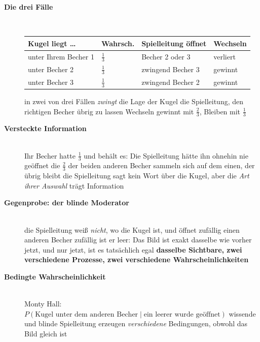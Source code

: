 \begin{description}
\item[{\rot\bf Die drei Fälle}]~\\[-\lblskip]
\begin{center}
\begin{tabular}{@{}llll@{}}
\toprule
\textbf{Kugel liegt \dots} & \textbf{Wahrsch.} & \textbf{Spielleitung öffnet} & \textbf{Wechseln} \\
\midrule
unter Ihrem Becher 1 & $\tfrac13$ & Becher 2 oder 3 & verliert \\
unter Becher 2 & $\tfrac13$ & zwingend Becher 3 & gewinnt \\
unter Becher 3 & $\tfrac13$ & zwingend Becher 2 & gewinnt \\
\bottomrule
\end{tabular}
\end{center}
\bi
  \ite in zwei von drei Fällen \emph{zwingt} die Lage der Kugel die
    Spielleitung, den richtigen Becher übrig zu lassen
  \ite Wechseln gewinnt mit $\tfrac23$, Bleiben mit $\tfrac13$
\ei
\os{\newpage}

\item[{\rot\bf Versteckte Information}]~\\[-\lblskip]
\bi
  \ite Ihr Becher hatte $\tfrac13$ und behält es: Die Spielleitung
    hätte ihn ohnehin nie geöffnet
  \ite die $\tfrac23$ der beiden anderen Becher sammeln sich auf dem
    einen, der übrig bleibt
  \ite die Spielleitung sagt kein Wort über die Kugel, aber die
    \emph{Art ihrer Auswahl} trägt Information
\ei
\os{\newpage}

\item[{\rot\bf Gegenprobe: der blinde Moderator}]~\\[-\lblskip]
\bi
  \ite die Spielleitung weiß \emph{nicht}, wo die Kugel ist, und öffnet
    zufällig einen anderen Becher
  \ite zufällig ist er leer: Das Bild ist exakt dasselbe wie vorher
  \ite jetzt, und nur jetzt, ist es tatsächlich egal
  \ite \textbf{dasselbe Sichtbare, zwei verschiedene Prozesse, zwei
    verschiedene Wahrscheinlichkeiten}
\ei
{}
\os{\newpage}

\item[{\rot\bf Bedingte Wahrscheinlichkeit}]~\\
\bi
  \ite Monty Hall: $P(\text{Kugel unter dem anderen Becher} \mid
    \text{ein leerer wurde geöffnet})$
  \ite wissende und blinde Spielleitung erzeugen \emph{verschiedene}
    Bedingungen, obwohl das Bild gleich ist
\ei
\os{\newpage}
\end{description}

